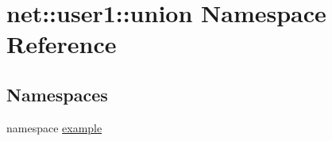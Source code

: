 \hypertarget{namespacenet_1_1user1_1_1union}{\section{net\-:\-:user1\-:\-:union \-Namespace \-Reference}
\label{namespacenet_1_1user1_1_1union}
}
\subsection*{\-Namespaces}
\begin{DoxyCompactItemize}
\item 
namespace \hyperlink{namespacenet_1_1user1_1_1union_1_1example}{example}
\end{DoxyCompactItemize}
